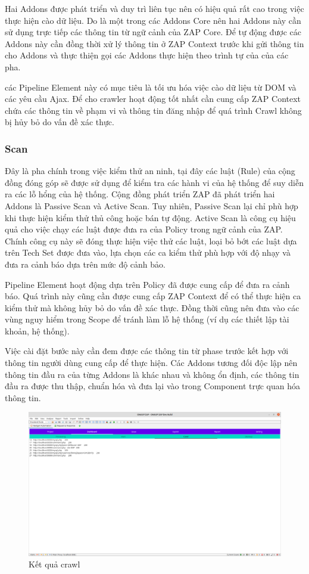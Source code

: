 \documentclass[./../main.tex]{subfiles}
\begin{document}
Hai Addons được phát triển và duy trì liên tục nên có hiệu quả rất cao trong việc thực hiện cào dữ liệu. Do là một trong các Addons Core nên hai Addons này cần sử dụng trực tiếp các thông tin từ ngữ cảnh của ZAP Core. Để tự động được các Addons này cần đồng thời xử lý thông tin ở ZAP Context trước khi gửi thông tin cho Addons và thực thiện gọi các Addons thực hiện theo trình tự của của các pha.

các Pipeline Element này có mục tiêu là tối ưu hóa việc cào dữ liệu từ DOM và các yêu cầu Ajax. Để cho crawler hoạt động tốt nhất cần cung cấp ZAP Context chứa các thông tin về phạm vi và thông tin đăng nhập để quá trình Crawl không bị hủy bỏ do vấn đề xác thực.
\subsubsection{Scan}

Đây là pha chính trong việc kiểm thử an ninh, tại đây các luật (Rule) của cộng đồng đóng góp sẽ được sử dụng để kiểm tra các hành vi của hệ thống để suy diễn ra các lỗ hổng của hệ thống. Cộng đồng phát triển ZAP đã phát triển hai Addons là Passive Scan và Active Scan. Tuy nhiên, Passive Scan lại chỉ phù hợp khi thực hiện kiểm thử thủ công hoặc bán tự động. Active Scan là công cụ hiệu quả cho việc chạy các luật được đưa ra của Policy trong ngữ cảnh của ZAP. Chính công cụ này sẽ đóng thực hiện việc thử các luật, loại bỏ bớt các luật dựa trên Tech Set được đưa vào, lựa chọn các ca kiểm thử phù hợp với độ nhạy và đưa ra cảnh báo dựa trên mức độ cảnh bảo.

Pipeline Element hoạt động dựa trên Policy đã được cung cấp để đưa ra cảnh báo. Quá trình này cũng cần được cung cấp ZAP Context để có thể thực hiện ca kiểm thử mà không hủy bỏ do vấn đề xác thực. Đồng thời cũng nên đưa vào các vùng nguy hiểm trong Scope để tránh làm lỗ hệ thống (ví dụ các thiết lập tài khoản, hệ thống).

Việc cài đặt bước này cần đem được các thông tin từ phase trước kết hợp với thông tin người dùng cung cấp để thực hiện. Các Addons tương đối độc lập nên thông tin đầu ra của từng Addons là khác nhau và không ổn định, các thông tin đầu ra được thu thập, chuẩn hóa và đưa lại vào trong Component trực quan hóa thông tin.

\begin{figure}[H]
	\includegraphics[width=\linewidth]{./images/scan_result.png}
	\caption{Kết quả crawl}
	\label{fig:scan_result}
\end{figure}
\end{document}
